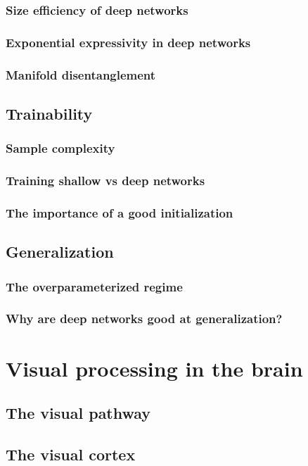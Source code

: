 \documentclass[11pt]{book} %
\begin{document}
\subsubsection{Size efficiency of deep networks}
\subsubsection{Exponential expressivity in deep networks}
\subsubsection{Manifold disentanglement}
\subsection{Trainability}
\subsubsection{Sample complexity}
\subsubsection{Training shallow vs deep networks}
\subsubsection{The importance of a good initialization}
\subsection{Generalization}
\subsubsection{The overparameterized regime}
\subsubsection{Why are deep networks good at generalization?}

\section{Visual processing in the brain}
\subsection{The visual pathway}
\subsection{The visual cortex}
\end{document}
